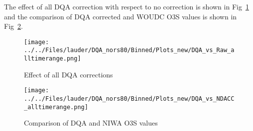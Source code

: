 The effect of all DQA correction with respect to no correction is shown in Fig~\ref{fig:dqa_all} and the comparison of DQA corrected and
WOUDC O3S values is shown in Fig~\ref{fig:fig_dqa_ndacc}.

                        \begin{figure}
        \centering
\texttt{[image: ../../Files/lauder/DQA\_nors80/Binned/Plots\_new/DQA\_vs\_Raw\_alltimerange.png]}
    \caption{Effect of all DQA corrections}
            \label{fig:dqa_all}
    \end{figure}
%
                        \begin{figure}
        \centering
\texttt{[image: ../../Files/lauder/DQA\_nors80/Binned/Plots\_new/DQA\_vs\_NDACC\_alltimerange.png]}
    \caption{Comparison of DQA and NIWA O3S values}
            \label{fig:fig_dqa_ndacc}
    \end{figure}
%
%
%
%
%
